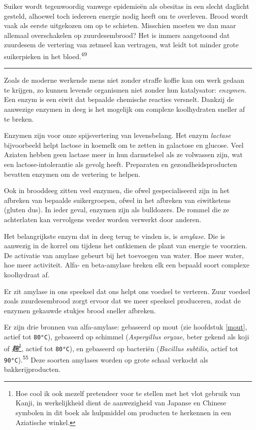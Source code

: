 \documentclass[
  11pt,
  dutch,
]{memoir}
\begin{document}
Suiker wordt tegenwoordig vanwege epidemieën als obesitas in een slecht
daglicht gesteld, alhoewel toch iedereen energie nodig heeft om te
overleven. Brood wordt vaak als eerste uitgekozen om op te schieten.
Misschien moeten we dan maar allemaal overschakelen op zuurdesembrood?
Het is immers aangetoond dat zuurdesem de vertering van zetmeel kan
vertragen, wat leidt tot minder grote suikerpieken in het
bloed.\textsuperscript{49}

\pfbreak

Zoals de moderne werkende mens niet zonder straffe koffie kan om werk
gedaan te krijgen, zo kunnen levende organismen niet zonder hun
katalysator: \emph{enzymen}. Een enzym is een eiwit dat bepaalde
chemische reacties versnelt. Dankzij de aanwezige enzymen in deeg is het
mogelijk om complexe koolhydraten sneller af te breken.

Enzymen zijn voor onze spijsvertering van levensbelang. Het enzym
\emph{lactase} bijvoorbeeld helpt lactose in koemelk om te zetten in
galactose en glucose. Veel Aziaten hebben geen lactase meer in hun
darmstelsel als ze volwassen zijn, wat een lactose-intolerantie als
gevolg heeft. Preparaten en gezondheidsproducten bevatten enzymen om de
vertering te helpen.

Ook in brooddeeg zitten veel enzymen, die ofwel gespecialiseerd zijn in
het afbreken van bepaalde suikergroepen, ofwel in het afbreken van
eiwitketens (gluten dus). In ieder geval, enzymen zijn als bulldozers.
De rommel die ze achterlaten kan vervolgens verder worden verwerkt door
anderen.

Het belangrijkste enzym dat in deeg terug te vinden is, is
\emph{amylase}. Die is aanwezig in de korrel om tijdens het ontkiemen de
plant van energie te voorzien. De activatie van amylase gebeurt bij het
toevoegen van water. Hoe meer water, hoe meer activiteit. Alfa- en
beta-amylase breken elk een bepaald soort complexe koolhydraat af.

Er zit amylase in ons speeksel dat ons helpt ons voedsel te verteren.
Zuur voedsel zoals zuurdesembrood zorgt ervoor dat we meer speeksel
produceren, zodat de enzymen gekauwde stukjes brood sneller afbreken.

Er zijn drie bronnen van alfa-amylase: gebaseerd op mout (zie hoofdstuk
\ref{mout}, actief tot \texttt{80°C}), gebaseerd op schimmel
(\emph{Aspergillus oryzae}, beter gekend als koji of
\emph{麹}\footnote{Hoe cool ik ook mezelf pretendeer voor te stellen met
  het vlot gebruik van Kanji, in werkelijkheid dient de aanwezigheid van
  Japanse en Chinese symbolen in dit boek als hulpmiddel om producten te
  herkennen in een Aziatische winkel.}, actief tot \texttt{80°C}), en
gebaseerd op bacteriën (\emph{Bacillus subtilis}, actief tot
\texttt{90°C}).\textsuperscript{55} Deze soorten amylases worden op
grote schaal verkocht als bakkerijproducten.
\end{document}
